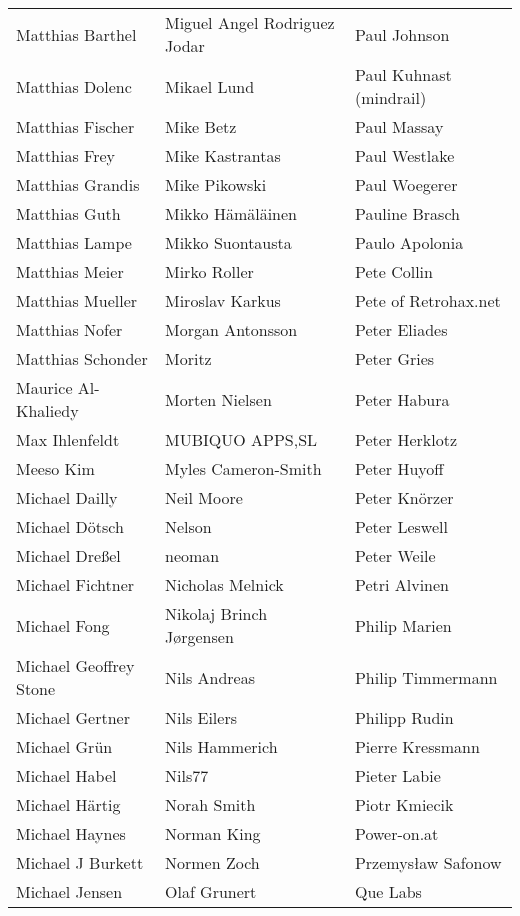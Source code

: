 \begin{small}
\begin{tabular}{p{4cm}p{4cm}p{4cm}}
\end{tabular}
\newpage
\setlength{\tabcolsep}{1mm}
\begin{tabular}{p{4cm}p{4cm}p{4cm}}
Matthias Barthel & Miguel Angel Rodriguez Jodar & Paul Johnson \\
Matthias Dolenc & Mikael Lund & Paul Kuhnast (mindrail) \\
Matthias Fischer & Mike Betz & Paul Massay \\
Matthias Frey & Mike Kastrantas & Paul Westlake \\
Matthias Grandis & Mike Pikowski & Paul Woegerer \\
Matthias Guth & Mikko Hämäläinen & Pauline Brasch \\
Matthias Lampe & Mikko Suontausta & Paulo Apolonia \\
Matthias Meier & Mirko Roller & Pete Collin \\
Matthias Mueller & Miroslav Karkus & Pete of Retrohax.net \\
Matthias Nofer & Morgan Antonsson & Peter Eliades \\
Matthias Schonder & Moritz & Peter Gries \\
Maurice Al-Khaliedy & Morten Nielsen & Peter Habura \\
Max Ihlenfeldt & MUBIQUO APPS,SL & Peter Herklotz \\
Meeso Kim & Myles Cameron-Smith & Peter Huyoff \\
Michael Dailly & Neil Moore & Peter Knörzer \\
Michael Dötsch & Nelson & Peter Leswell \\
Michael Dreßel & neoman & Peter Weile \\
Michael Fichtner & Nicholas Melnick & Petri Alvinen \\
Michael Fong & Nikolaj Brinch Jørgensen & Philip Marien \\
Michael Geoffrey Stone & Nils Andreas & Philip Timmermann \\
Michael Gertner & Nils Eilers & Philipp Rudin \\
Michael Grün & Nils Hammerich & Pierre Kressmann \\
Michael Habel & Nils77 & Pieter Labie \\
Michael Härtig & Norah Smith & Piotr Kmiecik \\
Michael Haynes & Norman King & Power-on.at \\
Michael J Burkett & Normen Zoch & Przemysław Safonow \\
Michael Jensen & Olaf Grunert & Que Labs \\

\end{tabular}
\end{small}
